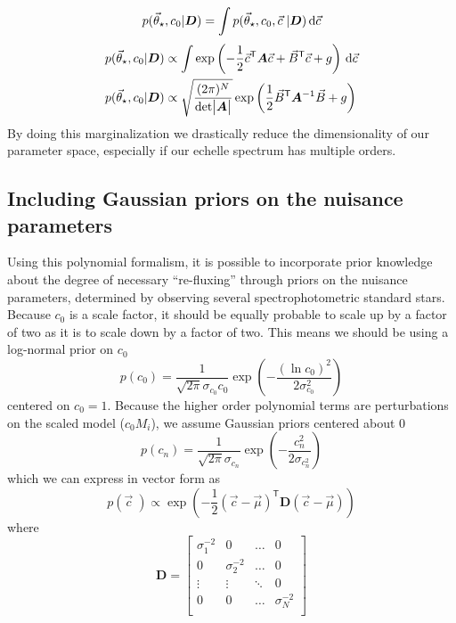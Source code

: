 \documentclass[preprint]{aastex} %
\newcommand{\vt}{\vec{\theta}}
\newcommand{\vstar}{\vt_{\star}}
\newcommand{\vc}{\vec{c}}
\newcommand{\fMi}{M_i}
\newcommand{\fD}{ {\bm D}}
\newcommand{\dd}{\,{\rm d}}
\newcommand{\trans}{\mathsf{T}}
\begin{document}
\begin{equation}
  p(\vstar, c_0 | \fD) = \int p(\vstar, c_0, \vc\; | \fD) \dd \vc
\end{equation}
\begin{align}
  p(\vstar, c_0 | \fD) &\propto \int \exp \left ( - \frac{1}{2} \vc^\trans {\bm A} \vc + \vec{B}^\trans \vc + g \right ) \dd \vc\\
  p(\vstar, c_0 | \fD) &\propto \sqrt{\frac{(2 \pi )^N}{ {\rm det} \bigl |{\bm A} \bigr |}} \exp{ \left ( \frac{1}{2} \vec{B}^\trans {\bm A}^{-1} \vec{B} + g \right )}
\end{align}
By doing this marginalization we drastically reduce the dimensionality of our parameter space, especially if our echelle spectrum has multiple orders. 

\subsection{Including Gaussian priors on the nuisance parameters}
\label{sec:priors}
Using this polynomial formalism, it is possible to incorporate prior knowledge about the degree of necessary ``re-fluxing'' through priors on the nuisance parameters, determined by observing several spectrophotometric standard stars. Because $c_0$ is a scale factor, it should be equally probable to scale up by a factor of two as it is to scale down by a factor of two. This means we should be using a log-normal prior on $c_0$
\begin{equation}
  p(c_0) = \frac{1}{\sqrt{2 \pi} \sigma_{c_0} c_0} \exp \left( -\frac{(\ln c_0)^2}{2 \sigma_{c_0}^2} \right)
\end{equation}
centered on $c_0 = 1$. Because the higher order polynomial terms are perturbations on the scaled model ($c_0 \fMi$), we assume Gaussian priors centered about 0
\begin{equation}
  p(c_n) = \frac{1}{\sqrt{2 \pi} \sigma_{c_n}} \exp \left( - \frac{c_n^2}{2 \sigma_{c_n^2}} \right)
\end{equation}
which we can express in vector form as
\begin{equation}
  p(\vc\;) \propto \exp \left ( -\frac{1}{2} (\vc - \vec{\mu})^\trans {\bm D} (\vc - \vec{\mu}) \right )
  \label{eqn:nuisance_prior} 
\end{equation}
where 
\begin{equation}
  {\bm D} = 
  \begin{bmatrix}
    \sigma_1^{-2} & 0 & \hdots & 0 \\
    0 & \sigma_2^{-2} & \hdots & 0 \\
    \vdots & \vdots & \ddots & 0 \\
    0 & 0 & \hdots & \sigma_N^{-2} \\
  \end{bmatrix}
\end{equation}
\end{document}
